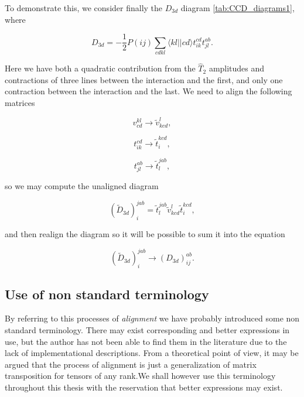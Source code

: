 To demonstrate this, we consider finally the $D_{3d}$ diagram \ref{tab:CCD_diagrams1}, where 

\begin{equation}
D_{3d}= -\frac{1}{2} P(ij) \sum_{cdkl} \langle kl \vert \vert cd \rangle t_{ik}^{cd} t_{jl}^{ab}.
\end{equation}

Here we have both a quadratic contribution from the $\hat{T}_2$ amplitudes and contractions of three lines between the interaction and the first, and only one contraction between the interaction and the last. We need to align the following matrices

\begin{equation}
v^{kl}_{cd} \rightarrow \tilde{v}_{kcd}^{l},
\end{equation}

\begin{equation}
t_{ik}^{cd} \rightarrow \tilde{t}^{kcd}_i,
\label{eqn:align_t2}
\end{equation}

\begin{equation}
t_{jl}^{ab} \rightarrow \tilde{t}^{jab}_l,
\end{equation}

so we may compute the unaligned diagram

\begin{equation}
(\tilde{D}_{3d})^{jab}_{i} = \tilde{t}^{jab}_l \tilde{v}_{kcd}^{l}  \tilde{t}^{kcd}_i,
\end{equation}

and then realign the diagram so it will be possible to sum it into the equation

\begin{equation}
 (\tilde{D}_{3d})^{jab}_{i} \rightarrow (D_{3d})^{ab}_{ij}.
\end{equation}

\subsection{Use of non standard terminology}

By referring to this processes of \emph{alignment} we have probably introduced some non standard terminology. There may exist corresponding and better expressions in use, but the author has not been able to find them in the literature due to the lack of implementational descriptions. From a theoretical point of view, it may be argued that the process of alignment is just a generalization of matrix transposition for tensors of any rank.We shall however use this terminology throughout this thesis with the reservation that better expressions may exist.



